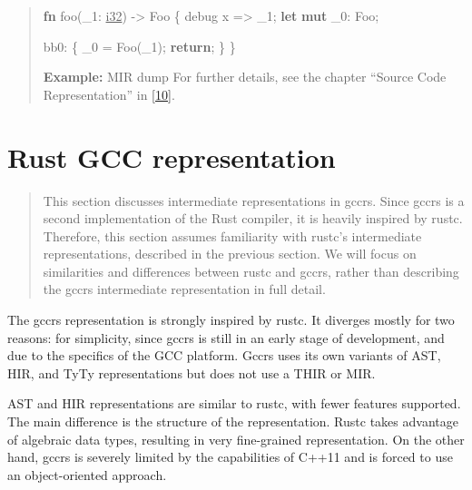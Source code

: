 \documentclass[
  11pt,
  twoside,symmetric]{report}
\newenvironment{Shaded}{}{}
\newcommand{\ControlFlowTok}[1]{\textbf{#1}}
\newcommand{\DataTypeTok}[1]{\underline{#1}}
\newcommand{\KeywordTok}[1]{\textbf{#1}}
\newcommand{\NormalTok}[1]{#1}
\newcommand{\OperatorTok}[1]{#1}
\begin{document}
\begin{quote}
\begin{Shaded}
\begin{Highlighting}[]
\KeywordTok{fn}\NormalTok{ foo(\_1}\OperatorTok{:} \DataTypeTok{i32}\NormalTok{) }\OperatorTok{{-}\textgreater{}}\NormalTok{ Foo }\OperatorTok{\{}
\NormalTok{    debug x }\OperatorTok{=\textgreater{}}\NormalTok{ \_1}\OperatorTok{;}
    \KeywordTok{let} \KeywordTok{mut}\NormalTok{ \_0}\OperatorTok{:}\NormalTok{ Foo}\OperatorTok{;}

\NormalTok{    bb0}\OperatorTok{:} \OperatorTok{\{}
\NormalTok{        \_0 }\OperatorTok{=}\NormalTok{ Foo(\_1)}\OperatorTok{;}
        \ControlFlowTok{return}\OperatorTok{;}
    \OperatorTok{\}}
\OperatorTok{\}}
\end{Highlighting}
\end{Shaded}

\textbf{Example:} MIR dump For further details, see the chapter ``Source
Code Representation'' in \protect\hyperlink{ref-devguide}{{[}10{]}}.
\end{quote}

\hypertarget{rust-gcc-representation}{%
\section{Rust GCC representation}\label{rust-gcc-representation}}

\begin{quote}
This section discusses intermediate representations in gccrs. Since
gccrs is a second implementation of the Rust compiler, it is heavily
inspired by rustc. Therefore, this section assumes familiarity with
rustc's intermediate representations, described in the previous section.
We will focus on similarities and differences between rustc and gccrs,
rather than describing the gccrs intermediate representation in full
detail.
\end{quote}

The gccrs representation is strongly inspired by rustc. It diverges
mostly for two reasons: for simplicity, since gccrs is still in an early
stage of development, and due to the specifics of the GCC platform.
Gccrs uses its own variants of AST, HIR, and TyTy representations but
does not use a THIR or MIR.

AST and HIR representations are similar to rustc, with fewer features
supported. The main difference is the structure of the representation.
Rustc takes advantage of algebraic data types, resulting in very
fine-grained representation. On the other hand, gccrs is severely
limited by the capabilities of C++11 and is forced to use an
object-oriented approach.
\end{document}
